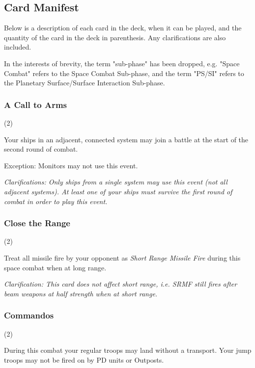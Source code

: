 \documentclass[a4paper,11pt,twocolumn]{article}
\begin{document}
\subsection{Card Manifest}

Below is a description of each card in the deck, when it can be played, and the quantity of the card in the deck in parenthesis. Any clarifications are also included.

In the interests of brevity, the term "sub-phase" has been dropped, e.g. "Space Combat" refers to the Space Combat Sub-phase, and the term "PS/SI" refers to the Planetary Surface/Surface Interaction Sub-phase.

\subsubsection{A Call to Arms} (2)


Your ships in an adjacent, connected system may join a battle at the start of the second round of combat.

Exception: Monitors may not use this event.

\textit{Clarifications: Only ships from a single system may use this event (not all adjacent systems). At least one of your ships must survive the first round of combat in order to play this event.}

\subsubsection{Close the Range} (2)


Treat all missile fire by your opponent as \textit{Short Range Missile Fire} during this space combat when at long range.

\textit{Clarification: This card does not affect short range, i.e. SRMF still fires after beam weapons at half strength when at short range.}

\subsubsection{Commandos} (2)


During this combat your regular troops may land without a transport. Your jump troops may not be fired on by PD units or Outposts.
\end{document}
